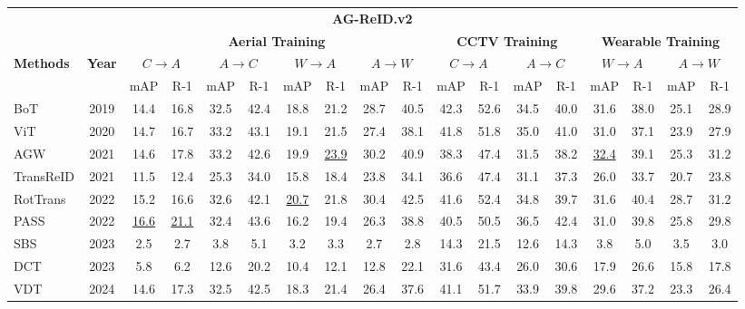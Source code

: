 \documentclass[border=4pt]{standalone}
\begin{document}
\scriptsize
\setlength{\tabcolsep}{3pt}
\begin{tabular}{l c cccccccc cccc cccc}
\toprule
\multicolumn{18}{c}{\textbf{AG-ReID.v2}} \\
\cmidrule(lr){1-18}
& & \multicolumn{8}{c}{\textbf{Aerial Training}} & \multicolumn{4}{c}{\textbf{CCTV Training}} & \multicolumn{4}{c}{\textbf{Wearable Training}} \\
\cmidrule(lr){3-10} \cmidrule(lr){11-14} \cmidrule(lr){15-18}
\textbf{Methods} & \textbf{Year} & \multicolumn{2}{c}{$C \rightarrow A$} & \multicolumn{2}{c}{$A \rightarrow C$} & \multicolumn{2}{c}{$W \rightarrow A$} & \multicolumn{2}{c}{$A \rightarrow W$} & \multicolumn{2}{c}{$C \rightarrow A$} & \multicolumn{2}{c}{$A \rightarrow C$} & \multicolumn{2}{c}{$W \rightarrow A$} & \multicolumn{2}{c}{$A \rightarrow W$} \\
\cmidrule(lr){3-4} \cmidrule(lr){5-6} \cmidrule(lr){7-8} \cmidrule(lr){9-10} \cmidrule(lr){11-12} \cmidrule(lr){13-14} \cmidrule(lr){15-16} \cmidrule(lr){17-18}
& & mAP & R-1 & mAP & R-1 & mAP & R-1 & mAP & R-1 & mAP & R-1 & mAP & R-1 & mAP & R-1 & mAP & R-1 \\
\midrule
BoT & 2019 & 14.4 & 16.8 & 32.5 & 42.4 & 18.8 & 21.2 & 28.7 & 40.5 & 42.3 & 52.6 & 34.5 & 40.0 & 31.6 & 38.0 & 25.1 & 28.9 \\
ViT & 2020 & 14.7 & 16.7 & 33.2 & 43.1 & 19.1 & 21.5 & 27.4 & 38.1 & 41.8 & 51.8 & 35.0 & 41.0 & 31.0 & 37.1 & 23.9 & 27.9 \\
AGW & 2021 & 14.6 & 17.8 & 33.2 & 42.6 & 19.9 & \underline{23.9} & 30.2 & 40.9 & 38.3 & 47.4 & 31.5 & 38.2 & \underline{32.4} & 39.1 & 25.3 & 31.2 \\
TransReID & 2021 & 11.5 & 12.4 & 25.3 & 34.0 & 15.8 & 18.4 & 23.8 & 34.1 & 36.6 & 47.4 & 31.1 & 37.3 & 26.0 & 33.7 & 20.7 & 23.8 \\
RotTrans & 2022 & 15.2 & 16.6 & 32.6 & 42.1 & \underline{20.7} & 21.8 & 30.4 & 42.5 & 41.6 & 52.4 & 34.8 & 39.7 & 31.6 & 40.4 & 28.7 & 31.2 \\
PASS & 2022 & \underline{16.6} & \underline{21.1} & 32.4 & 43.6 & 16.2 & 19.4 & 26.3 & 38.8 & 40.5 & 50.5 & 36.5 & 42.4 & 31.0 & 39.8 & 25.8 & 29.8 \\
SBS & 2023 & 2.5 & 2.7 & 3.8 & 5.1 & 3.2 & 3.3 & 2.7 & 2.8 & 14.3 & 21.5 & 12.6 & 14.3 & 3.8 & 5.0 & 3.5 & 3.0 \\
DCT & 2023 & 5.8 & 6.2 & 12.6 & 20.2 & 10.4 & 12.1 & 12.8 & 22.1 & 31.6 & 43.4 & 26.0 & 30.6 & 17.9 & 26.6 & 15.8 & 17.8 \\
VDT & 2024 & 14.6 & 17.3 & 32.5 & 42.5 & 18.3 & 21.4 & 26.4 & 37.6 & 41.1 & 51.7 & 33.9 & 39.8 & 29.6 & 37.2 & 23.3 & 26.4 \\

\end{tabular}
\end{document}
